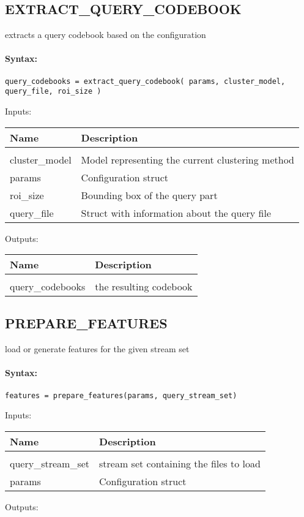 \subsection{EXTRACT\_QUERY\_CODEBOOK}

extracts a query codebook based on the configuration

\paragraph{Syntax:} \verb|query_codebooks = extract_query_codebook( params, cluster_model, query_file, roi_size )|

Inputs:

\begin{tabular}{|l|p{5cm}|}
\hline
\textbf{Name} & \textbf{Description} \\
\hline \hline \\
cluster\_model & Model representing the current clustering method  \\ \hline
params & Configuration struct  \\ \hline
roi\_size & Bounding box of the query part  \\ \hline
query\_file & Struct with information about the query file  \\ \hline
\end{tabular}
Outputs:

\begin{tabular}{|l|p{5cm}|}
\hline
\textbf{Name} & \textbf{Description} \\
\hline \hline \\
query\_codebooks & the resulting codebook  \\ \hline
\end{tabular}

\subsection{PREPARE\_FEATURES}

load or generate features for the given stream set

\paragraph{Syntax:} \verb|features = prepare_features(params, query_stream_set)|

Inputs:

\begin{tabular}{|l|p{5cm}|}
\hline
\textbf{Name} & \textbf{Description} \\
\hline \hline \\
query\_stream\_set & stream set containing the files to load  \\ \hline
params & Configuration struct  \\ \hline
\end{tabular}
Outputs:


